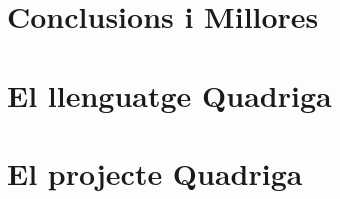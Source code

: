 \documentclass{book}
\begin{document}

\newpage

\newpage


\tableofcontents
\listoffigures







\chapter{Conclusions i Millores}

% 



\appendix
\newpage
\chapter{El llenguatge Quadriga}
\chapter{El projecte Quadriga}
\end{document}
